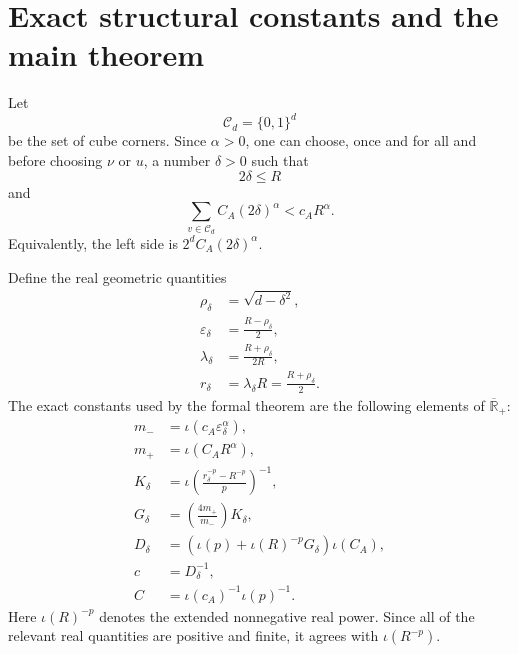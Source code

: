 \documentclass[11pt]{article}
\theoremstyle{remark}
\newcommand{\Rbarp}{\overline{\mathbb R}_{+}}
\newcommand{\Corners}{\mathcal C_d}
\begin{document}
\section{Exact structural constants and the main theorem}

Let
\[
  \Corners=\{0,1\}^d
\]
be the set of cube corners.  Since \(\alpha>0\), one can choose, once and
for all and before choosing \(\nu\) or \(u\), a number \(\delta>0\) such
that
\begin{equation}
  2\delta\leq R                                                        \label{eq:delta-radius}
\end{equation}
and
\begin{equation}
  \sum_{v\in\Corners} C_A(2\delta)^\alpha
  <
  c_A R^\alpha.                                                        \label{eq:delta-small}
\end{equation}
Equivalently, the left side is \(2^d C_A(2\delta)^\alpha\).

Define the real geometric quantities
\begin{align}
  \rho_\delta
  &=
  \sqrt{d-\delta^2},                                                    \label{eq:rho}\\
  \varepsilon_\delta
  &=
  \frac{R-\rho_\delta}{2},                                              \label{eq:epsilon}\\
  \lambda_\delta
  &=
  \frac{R+\rho_\delta}{2R},                                             \label{eq:lambda}\\
  r_\delta
  &=
  \lambda_\delta R
  =
  \frac{R+\rho_\delta}{2}.                                              \label{eq:anchor-scale}
\end{align}
The exact constants used by the formal theorem are the following elements
of \(\Rbarp\):
\begin{align}
  m_-
  &=
  \iota\!\left(c_A\varepsilon_\delta^\alpha\right),                     \label{eq:mminus}\\
  m_+
  &=
  \iota\!\left(C_A R^\alpha\right),                                    \label{eq:mplus}\\
  K_\delta
  &=
  \iota\!\left(
    \frac{r_\delta^{-p}-R^{-p}}{p}
  \right)^{-1},                                                         \label{eq:tail-constant}\\
  G_\delta
  &=
  \left(\frac{4m_+}{m_-}\right)K_\delta,                                \label{eq:global-constant}\\
  D_\delta
  &=
  \left(
    \iota(p)+\iota(R)^{-p}G_\delta
  \right)\iota(C_A),                                                    \label{eq:reverse-constant}\\
  c
  &=
  D_\delta^{-1},                                                        \label{eq:lower-constant}\\
  C
  &=
  \iota(c_A)^{-1}\iota(p)^{-1}.                                        \label{eq:upper-constant}
\end{align}
Here \(\iota(R)^{-p}\) denotes the extended nonnegative real power.  Since
all of the relevant real quantities are positive and finite, it agrees
with \(\iota(R^{-p})\).
\end{document}
